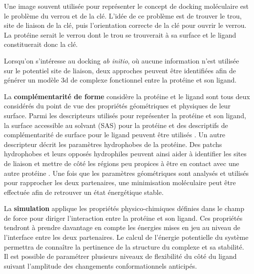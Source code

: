 Une image souvent utilisée pour représenter le concept de docking moléculaire est le problème du verrou et de la clé. L'idée de ce problème est de trouver le trou, site de liaison de la clé, puis l'orientation correcte de la clé pour ouvrir le verrou. La protéine serait le verrou dont le trou se trouverait à sa surface et le ligand constituerait donc la clé.


Lorsqu'on s'intéresse au docking \textit{ab initio}, où aucune information n'est utilisée sur le potentiel site de liaison, deux approches peuvent être identifiées afin de générer un modèle 3d de complexe fonctionnel entre la protéine et son ligand.

La \textbf{complémentarité de forme} considère la protéine et le ligand sont tous deux considérés du point de vue des propriétés géométriques et physiques de leur surface. Parmi les descripteurs utilisés pour représenter la protéine et son ligand, la surface accessible au solvant (SAS) pour la protéine et des descriptifs de complémentarité de surface pour le ligand peuvent être utilisés \cite{shoichet1992molecular}. Un autre descripteur décrit les paramètres hydrophobes de la protéine. Des patchs hydrophobes et leurs opposés hydrophiles peuvent ainsi aider à identifier les sites de liaison et mettre de côté les régions peu propices à être en contact avec une autre protéine \cite{jones1996principles}. Une fois que les paramètres géométriques sont analysés et utilisés pour rapprocher les deux partenaires, une minimisation moléculaire peut être effectuée afin de retrouver un état énergétique stable.

La \textbf{simulation} applique les propriétés physico-chimiques définies dans le champ de force pour diriger l'interaction entre la protéine et son ligand. Ces propriétés tendront à prendre davantage en compte les énergies mises en jeu au niveau de l'interface entre les deux partenaires. Le calcul de l'énergie potentielle du système permettra de connaître la pertinence de la structure du complexe et sa stabilité. Il est possible de paramétrer plusieurs niveaux de flexibilité du côté du ligand suivant l'amplitude des changements conformationnels anticipés.

